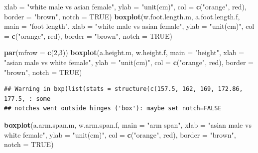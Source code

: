 \documentclass[]{article}
\newenvironment{Shaded}{\begin{snugshade}}{\end{snugshade}}
\newcommand{\DataTypeTok}[1]{\textcolor[rgb]{0.13,0.29,0.53}{#1}}
\newcommand{\DecValTok}[1]{\textcolor[rgb]{0.00,0.00,0.81}{#1}}
\newcommand{\KeywordTok}[1]{\textcolor[rgb]{0.13,0.29,0.53}{\textbf{#1}}}
\newcommand{\NormalTok}[1]{#1}
\newcommand{\OtherTok}[1]{\textcolor[rgb]{0.56,0.35,0.01}{#1}}
\newcommand{\StringTok}[1]{\textcolor[rgb]{0.31,0.60,0.02}{#1}}
\begin{document}
\begin{Shaded}
\begin{Highlighting}[]
        \DataTypeTok{xlab =} \StringTok{"white male vs asian female"}\NormalTok{,}
        \DataTypeTok{ylab =} \StringTok{"unit(cm)"}\NormalTok{,}
        \DataTypeTok{col =} \KeywordTok{c}\NormalTok{(}\StringTok{"orange"}\NormalTok{, }\StringTok{\textquotesingle{}red\textquotesingle{}}\NormalTok{),}
        \DataTypeTok{border =} \StringTok{"brown"}\NormalTok{,}
        \DataTypeTok{notch =} \OtherTok{TRUE}\NormalTok{)}
\KeywordTok{boxplot}\NormalTok{(w.foot.length.m, a.foot.length.f,}
        \DataTypeTok{main =} \StringTok{"foot length"}\NormalTok{,}
        \DataTypeTok{xlab =} \StringTok{"white male vs asian female"}\NormalTok{,}
        \DataTypeTok{ylab =} \StringTok{"unit(cm)"}\NormalTok{,}
        \DataTypeTok{col =} \KeywordTok{c}\NormalTok{(}\StringTok{"orange"}\NormalTok{, }\StringTok{\textquotesingle{}red\textquotesingle{}}\NormalTok{),}
        \DataTypeTok{border =} \StringTok{"brown"}\NormalTok{,}
        \DataTypeTok{notch =} \OtherTok{TRUE}\NormalTok{)}
\end{Highlighting}
\end{Shaded}

\begin{Shaded}
\begin{Highlighting}[]
\KeywordTok{par}\NormalTok{(}\DataTypeTok{mfrow =} \KeywordTok{c}\NormalTok{(}\DecValTok{2}\NormalTok{,}\DecValTok{3}\NormalTok{))}
\KeywordTok{boxplot}\NormalTok{(a.height.m, w.height.f,}
        \DataTypeTok{main =} \StringTok{"height"}\NormalTok{,}
        \DataTypeTok{xlab =} \StringTok{"asian male vs white female"}\NormalTok{,}
        \DataTypeTok{ylab =} \StringTok{"unit(cm)"}\NormalTok{,}
        \DataTypeTok{col =} \KeywordTok{c}\NormalTok{(}\StringTok{"orange"}\NormalTok{, }\StringTok{\textquotesingle{}red\textquotesingle{}}\NormalTok{),}
        \DataTypeTok{border =} \StringTok{"brown"}\NormalTok{,}
        \DataTypeTok{notch =} \OtherTok{TRUE}\NormalTok{)}
\end{Highlighting}
\end{Shaded}

\begin{verbatim}
## Warning in bxp(list(stats = structure(c(157.5, 162, 169, 172.86, 177.5, : some
## notches went outside hinges ('box'): maybe set notch=FALSE
\end{verbatim}

\begin{Shaded}
\begin{Highlighting}[]
\KeywordTok{boxplot}\NormalTok{(a.arm.span.m, w.arm.span.f,}
        \DataTypeTok{main =} \StringTok{"arm span"}\NormalTok{,}
        \DataTypeTok{xlab =} \StringTok{"asian male vs white female"}\NormalTok{,}
        \DataTypeTok{ylab =} \StringTok{"unit(cm)"}\NormalTok{,}
        \DataTypeTok{col =} \KeywordTok{c}\NormalTok{(}\StringTok{"orange"}\NormalTok{, }\StringTok{\textquotesingle{}red\textquotesingle{}}\NormalTok{),}
        \DataTypeTok{border =} \StringTok{"brown"}\NormalTok{,}
        \DataTypeTok{notch =} \OtherTok{TRUE}\NormalTok{)}
\end{Highlighting}
\end{Shaded}
\end{document}
